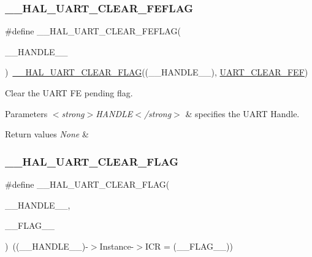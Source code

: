 \subsubsection{\texorpdfstring{\+\_\+\+\_\+\+H\+A\+L\+\_\+\+U\+A\+R\+T\+\_\+\+C\+L\+E\+A\+R\+\_\+\+F\+E\+F\+L\+AG}{\_\_HAL\_UART\_CLEAR\_FEFLAG}}
{\footnotesize\ttfamily \#define \+\_\+\+\_\+\+H\+A\+L\+\_\+\+U\+A\+R\+T\+\_\+\+C\+L\+E\+A\+R\+\_\+\+F\+E\+F\+L\+AG(\begin{DoxyParamCaption}\item[{}]{\+\_\+\+\_\+\+H\+A\+N\+D\+L\+E\+\_\+\+\_\+ }\end{DoxyParamCaption})~\hyperlink{group___u_a_r_t___exported___macros_ga9bd035161d41cde4f2568c7af06493bf}{\+\_\+\+\_\+\+H\+A\+L\+\_\+\+U\+A\+R\+T\+\_\+\+C\+L\+E\+A\+R\+\_\+\+F\+L\+AG}((\+\_\+\+\_\+\+H\+A\+N\+D\+L\+E\+\_\+\+\_\+), \hyperlink{group___u_a_r_t___i_t___c_l_e_a_r___flags_ga2040edf7a1daa2e9f352364e285ef5c3}{U\+A\+R\+T\+\_\+\+C\+L\+E\+A\+R\+\_\+\+F\+EF})}



Clear the U\+A\+RT FE pending flag. 


\begin{DoxyParams}{Parameters}
{\em $<$strong$>$\+H\+A\+N\+D\+L\+E$<$/strong$>$} & specifies the U\+A\+RT Handle. \\
\hline
\end{DoxyParams}

\begin{DoxyRetVals}{Return values}
{\em None} & \\
\hline
\end{DoxyRetVals}
\mbox{\label{group___u_a_r_t___exported___macros_ga9bd035161d41cde4f2568c7af06493bf}} 
\subsubsection{\texorpdfstring{\+\_\+\+\_\+\+H\+A\+L\+\_\+\+U\+A\+R\+T\+\_\+\+C\+L\+E\+A\+R\+\_\+\+F\+L\+AG}{\_\_HAL\_UART\_CLEAR\_FLAG}}
{\footnotesize\ttfamily \#define \+\_\+\+\_\+\+H\+A\+L\+\_\+\+U\+A\+R\+T\+\_\+\+C\+L\+E\+A\+R\+\_\+\+F\+L\+AG(\begin{DoxyParamCaption}\item[{}]{\+\_\+\+\_\+\+H\+A\+N\+D\+L\+E\+\_\+\+\_\+,  }\item[{}]{\+\_\+\+\_\+\+F\+L\+A\+G\+\_\+\+\_\+ }\end{DoxyParamCaption})~((\+\_\+\+\_\+\+H\+A\+N\+D\+L\+E\+\_\+\+\_\+)-\/$>$Instance-\/$>$I\+CR = (\+\_\+\+\_\+\+F\+L\+A\+G\+\_\+\+\_\+))}



